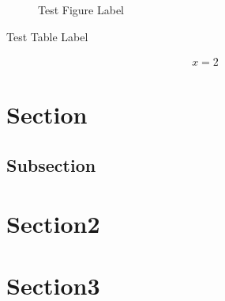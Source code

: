 
\begin{figure}
  \caption{Test Figure Label} \label{fig:figure}
\end{figure}

\begin{table}
  \caption{Test Table Label} \label{tab:table}
\end{table}

\begin{align}
  x = 2 \label{eq:equation}
\end{align}

\section{Section} \label{sec:sectionlabel}

\subsection[Test]{Subsection}  \label{sec:subsectionlabel}

\section*{Section2} \label{sec:online1} \section{Section3} \label{sec:online2}
